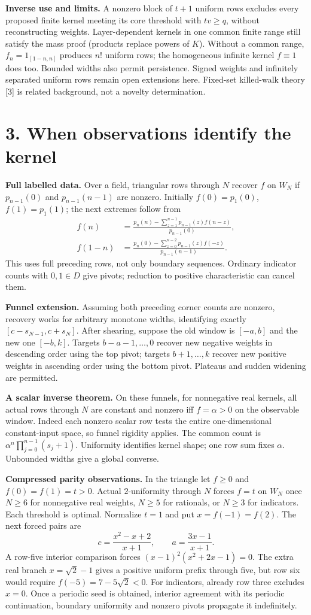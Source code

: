 \documentclass[10pt]{article}
\begin{document}
\textbf{Inverse use and limits.} A nonzero block of $t+1$ uniform rows excludes every proposed finite kernel meeting its core threshold with $tv\ge q$, without reconstructing weights. Layer-dependent kernels in one common finite range still satisfy the mass proof (products replace powers of $K$). Without a common range, $f_n=1_{[1-n,n]}$ produces $n!$ uniform rows; the homogeneous infinite kernel $f\equiv1$ does too. Bounded widths also permit persistence. Signed weights and infinitely separated uniform rows remain open extensions here. Fixed-set killed-walk theory [3] is related background, not a novelty determination.
\newpage
\section*{3. When observations identify the kernel}
\textbf{Full labelled data.} Over a field, triangular rows through $N$ recover $f$ on $W_N$ if $p_{n-1}(0)$ and $p_{n-1}(n-1)$ are nonzero. Initially $f(0)=p_1(0)$, $f(1)=p_1(1)$; the next extremes follow from
\begin{align*}
f(n)&=\frac{p_n(n)-\sum_{z=1}^{n-1}p_{n-1}(z)f(n-z)}{p_{n-1}(0)},\\
f(1-n)&=\frac{p_n(0)-\sum_{z=0}^{n-2}p_{n-1}(z)f(-z)}{p_{n-1}(n-1)}.
\end{align*}
This uses full preceding rows, not only boundary sequences. Ordinary indicator counts with $0,1\in D$ give pivots; reduction to positive characteristic can cancel them.

\textbf{Funnel extension.} Assuming both preceding corner counts are nonzero, recovery works for arbitrary monotone widths, identifying exactly $[c-s_{N-1},c+s_N]$. After shearing, suppose the old window is $[-a,b]$ and the new one $[-b,k]$. Targets $b-a-1,\ldots,0$ recover new negative weights in descending order using the top pivot; targets $b+1,\ldots,k$ recover new positive weights in ascending order using the bottom pivot. Plateaus and sudden widening are permitted.

\textbf{A scalar inverse theorem.} On these funnels, for nonnegative real kernels, all actual rows through $N$ are constant and nonzero iff $f=\alpha>0$ on the observable window. Indeed each nonzero scalar row tests the entire one-dimensional constant-input space, so funnel rigidity applies. The common count is $\alpha^n\prod_{j=0}^{n-1}(s_j+1)$. Uniformity identifies kernel shape; one row sum fixes $\alpha$. Unbounded widths give a global converse.

\textbf{Compressed parity observations.} In the triangle let $f\ge0$ and $f(0)=f(1)=t>0$. Actual $2$-uniformity through $N$ forces $f=t$ on $W_N$ once $N\ge6$ for nonnegative real weights, $N\ge5$ for rationals, or $N\ge3$ for indicators. Each threshold is optimal. Normalize $t=1$ and put $x=f(-1)=f(2)$. The next forced pairs are
\[
c=\frac{x^2-x+2}{x+1},\qquad a=\frac{3x-1}{x+1}.
\]
A row-five interior comparison forces $(x-1)^2(x^2+2x-1)=0$. The extra real branch $x=\sqrt2-1$ gives a positive uniform prefix through five, but row six would require $f(-5)=7-5\sqrt2<0$. For indicators, already row three excludes $x=0$. Once a periodic seed is obtained, interior agreement with its periodic continuation, boundary uniformity and nonzero pivots propagate it indefinitely.
\end{document}
